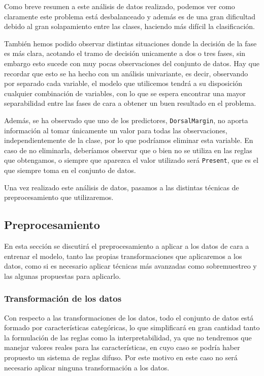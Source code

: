 Como breve resumen a este análisis de datos realizado, podemos ver como claramente este problema está desbalanceado y además es de una gran dificultad debido al gran solapamiento entre las clases, haciendo más difícil la clasificación.

También hemos podido observar distintas situaciones donde la decisión de la fase es más clara, acotando el tramo de decisión unicamente a dos o tres fases, sin embargo esto sucede con muy pocas observaciones del conjunto de datos. Hay que recordar que esto se ha hecho con un análisis univariante, es decir, observando por separado cada variable, el modelo que utilicemos tendrá a su disposición cualquier combinación de variables, con lo que se espera encontrar una mayor separabilidad entre las fases de cara a obtener un buen resultado en el problema.

Además, se ha observado que uno de los predictores, \texttt{DorsalMargin}, no aporta información al tomar únicamente un valor para todas las observaciones, independientemente de la clase, por lo que podríamos eliminar esta variable. En caso de no eliminarla, deberíamos observar que o bien no se utiliza en las reglas que obtengamos, o siempre que aparezca el valor utilizado será \texttt{Present}, que es el que siempre toma en el conjunto de datos.

Una vez realizado este análisis de datos, pasamos a las distintas técnicas de preprocesamiento que utilizaremos.


\subsection{Preprocesamiento} \label{sobremuestreo}

En esta sección se discutirá el preprocesamiento a aplicar a los datos de cara a entrenar el modelo, tanto las propias transformaciones que aplicaremos a los datos, como si es necesario aplicar técnicas más avanzadas como sobremuestreo y las algunas propuestas para aplicarlo.

\subsubsection{Transformación de los datos}

Con respecto a las transformaciones de los datos, todo el conjunto de datos está formado por características categóricas, lo que simplificará en gran cantidad tanto la formulación de las reglas como la interpretabilidad, ya que no tendremos que manejar valores reales para las características, en cuyo caso se podría haber propuesto un sistema de reglas difuso. Por este motivo en este caso no será necesario aplicar ninguna transformación a los datos.

